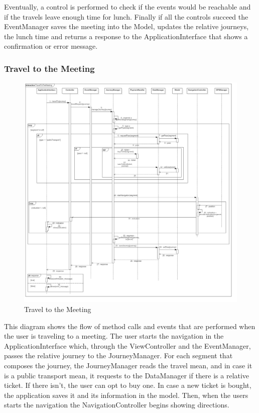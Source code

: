 Eventually, a control is performed to check if the events would be reachable and if the travels leave enough time for lunch.
Finally if all the controls succeed the EventManager saves the meeting into the Model, updates the relative journeys, the lunch time and returns a response to the ApplicationInterface that shows a confirmation or error message.

\subsubsection{Travel to the Meeting}
\begin{figure}[H]
\centering
\includegraphics[scale=0.25]{images/TravelToTheMeeting}
\caption{Travel to the Meeting}
\end{figure}This diagram shows the flow of method calls and events that are performed when the user is traveling to a meeting.
The user starts the navigation in the ApplicationInterface which, through the ViewController and the EventManager, passes the relative journey to the JourneyManager.
For each segment that composes the journey, the JourneyManager reads the travel mean, and in case it is a public transport mean, it requests to the DataManager if there is a relative ticket. If there isn’t, the user can opt to buy one.
In case a new ticket is bought, the application saves it and its information in the model. Then, when the users starts the navigation the NavigationController begins showing directions.
